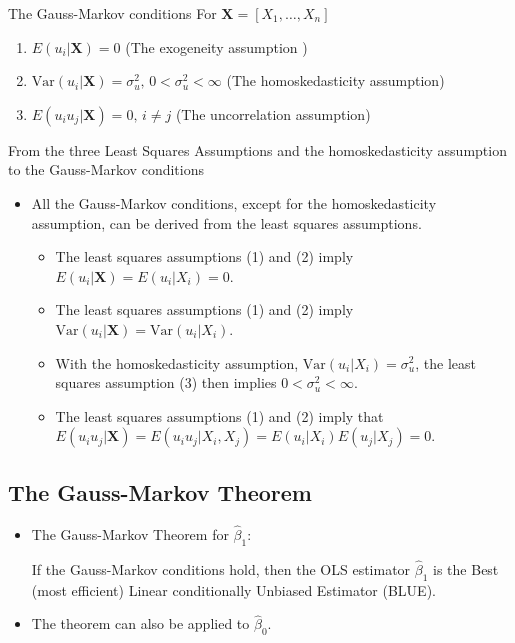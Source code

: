 \documentclass[presentation]{beamer}
\begin{document}
\begin{frame}[label={sec:org5ae1fc2}]{The Gauss-Markov conditions}
For \(\mathbf{X} = [X_1, \ldots, X_n]\)

\begin{enumerate}
\item \(E(u_i| \mathbf{X}) = 0\) (The exogeneity assumption )
\item \(\mathrm{Var}(u_i | \mathbf{X}) = \sigma^2_u,\, 0 < \sigma^2_u < \infty\)
(The homoskedasticity assumption)
\item \(E(u_i u_j | \mathbf{X}) = 0,\, i \neq j\) (The uncorrelation assumption)
\end{enumerate}
\end{frame}

\begin{frame}[label={sec:org8390062}]{From the three Least Squares Assumptions and the homoskedasticity assumption to the Gauss-Markov conditions}
\begin{itemize}
\item All the Gauss-Markov conditions, except for  the homoskedasticity
assumption, can be derived from the least squares assumptions.
\begin{itemize}
\item The least squares assumptions (1) and (2) imply \(E(u_i | \mathbf{X}) =
    E(u_i | X_i) = 0\).
\item The least squares assumptions (1) and (2) imply \(\mathrm{Var}(u_i|
    \mathbf{X}) = \mathrm{Var}(u_i | X_i)\).
\item With the homoskedasticity assumption, \(\mathrm{Var}(u_i | X_i) =
    \sigma^2_u\), the least squares assumption (3) then implies \(0 < \sigma^2_u <
    \infty\).
\item The least squares assumptions (1) and (2) imply that \(E(u_i u_j |
    \mathbf{X}) = E(u_i u_j | X_i, X_j) = E(u_i|X_i) E(u_j|X_j) = 0\).
\end{itemize}
\end{itemize}
\end{frame}

\subsection*{The Gauss-Markov Theorem}
\label{sec:orgf1febcb}

\begin{itemize}
\item The Gauss-Markov Theorem for \(\hat{\beta}_1\):

If the Gauss-Markov conditions hold, then the OLS estimator
\(\hat{\beta}_1\) is the Best (most efficient) Linear conditionally
Unbiased Estimator (BLUE).

\item The theorem can also be applied to \(\hat{\beta}_0\).
\end{itemize}
\end{document}
